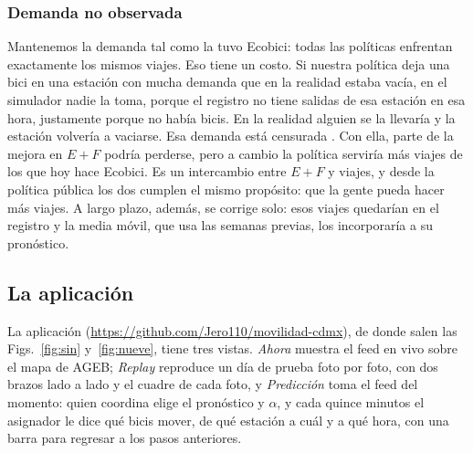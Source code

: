 \documentclass[conference,letterpaper,10pt]{IEEEtran}
\newcommand{\EF}{E+F}
\begin{document}
\subsubsection{Demanda no observada}
Mantenemos la demanda tal como la tuvo Ecobici: todas las políticas enfrentan exactamente los mismos viajes. Eso tiene un costo. Si nuestra política deja una bici en una estación con mucha demanda que en la realidad estaba vacía, en el simulador nadie la toma, porque el registro no tiene salidas de esa estación en esa hora, justamente porque no había bicis. En la realidad alguien se la llevaría y la estación volvería a vaciarse. Esa demanda está censurada \cite{negahban2019}. Con ella, parte de la mejora en $\EF$ podría perderse, pero a cambio la política serviría más viajes de los que hoy hace Ecobici. Es un intercambio entre $\EF$ y viajes, y desde la política pública los dos cumplen el mismo propósito: que la gente pueda hacer más viajes. A largo plazo, además, se corrige solo: esos viajes quedarían en el registro y la media móvil, que usa las \rsemanasHist{} semanas previas, los incorporaría a su pronóstico.

\subsection{La aplicación}
La aplicación (\url{https://github.com/Jero110/movilidad-cdmx}), de donde salen las Figs.~\ref{fig:sin} y~\ref{fig:nueve}, tiene tres vistas. \emph{Ahora} muestra el feed en vivo sobre el mapa de AGEB; \emph{Replay} reproduce un día de prueba foto por foto, con dos brazos lado a lado y el cuadre de cada foto, y \emph{Predicción} toma el feed del momento: quien coordina elige el pronóstico y $\alpha$, y cada quince minutos el asignador le dice qué bicis mover, de qué estación a cuál y a qué hora, con una barra para regresar a los pasos anteriores.

\vfill\null\newpage
\end{document}
